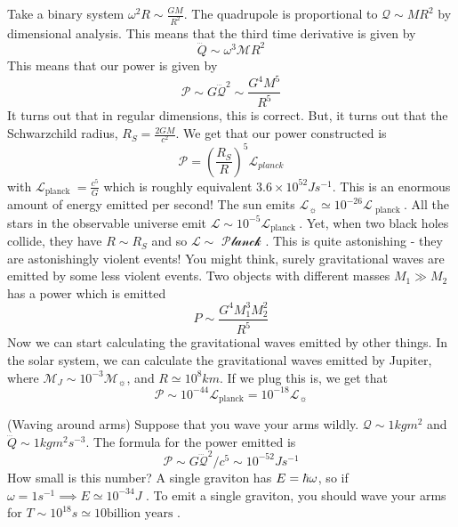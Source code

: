 \begin{example}
	Take a binary system $ \omega ^ 2 R \sim \frac{ G M }{ R ^ 2  }$. 
	The quadrupole 
	is proportional to $ \mathcal{  Q} \sim M R ^ 2 $
	by dimensional analysis. This means that 
	the third time derivative is given by 
	\[
		\dddot{Q} \sim \omega ^ 3 \mathcal{ M } R ^ 2 
	\]  This means that our power is given by 
	\[
		\mathcal{ P } \sim G  \dddot{\mathcal{ Q}} ^ 2 \sim 
		\frac{ G ^ 4 M ^ 5 }{ R ^ 5 } 
	\] It turns out that in regular dimensions, 
	this is correct. But, it turns out that the 
	Schwarzchild radius, $ R _ S = \frac{ 2 G M }{ c ^ 2 } $. 
	We get that our power constructed is 
	\[
		\mathcal{ P }  = \left( \frac{ R _ S}{ R }  \right)  ^{ 5 } 
		\mathcal{ L } _{ planck}
	\] with $ \mathcal{ L } _{ \text{planck  } }  = \frac{ c ^ 5 }{ G } $ which is roughly equivalent $ 3. 6   \times 10 ^{ 52 } J s ^{ - 1} $.  
	This is an enormous amount of energy emitted per second! 
	The sun emits $ \mathcal{ L } _{ \sun  } \simeq 10 ^{ - 26 } \mathcal{ L } _{ \text{ planck } }  $. All the stars in the 
	observable universe emit $ \mathcal{ L } \sim 10 ^{  - 5 } \mathcal{ L } _{ \text{planck } } $. Yet, when two black holes 
	collide, they have $ R \sim R _ S $ and so $ \mathcal{ L } \sim \mathcal{ \text{ Planck }}$. This is quite astonishing  -
	they are astonishingly violent events! You might think, 
	surely gravitational waves are emitted by some less violent 
	events. 
	Two objects with different masses $ M _ 1 \gg M _ 2 $ 
	has a power which is emitted 
	\[
	 P \sim \frac{ G ^  4 M _   1 ^ 3 M _ 2 ^ 2 }{ R ^ 5 }
	\] Now we can start calculating the gravitational 
	waves emitted by other things. 
	In the solar system, we can calculate the gravitational 
	waves emitted by Jupiter, where $ \mathcal{ M } _{ J }  \sim 
	10 ^{ - 3 } \mathcal{ M } _{ \sun } $, and $ R \simeq 10 ^{ 8 } km $. 
	If we plug this is, we get that 
	\[
	 \mathcal{ P } \sim 10 ^{ - 44 } \mathcal{ L }_{ \text{planck} } 
	  = 10 ^{ - 18 } \mathcal{ L } _{ \sun }
  \] 
\end{example}
\begin{example}{(Waving around arms)}
	Suppose that you wave your arms wildly. 
	$ \mathcal{ Q } \sim 1 kg m ^ 2 $ and 
	$ \dddot{Q} \sim 1 kg m ^ 2 s ^{ - 3 } $. 
	The formula for the power emitted is 
	\[
		\mathcal{ P } \sim G \dddot{\mathcal{ Q } }^ 2 / c ^ 5 \sim 10^{ - 5 2 } J s ^{ - 1 } 
	\]  How small is this number? A single 
	graviton has $ E  = \hbar \omega 	 $, so if $ \omega  = 1 s ^{ - 1 } \implies E \simeq 10 ^{ - 3 4} J $ . To emit a single graviton, you 
	should wave your arms for 
	$ T \sim 10 ^{ 18 } s \simeq 10 \text{billion years } $.
\end{example}


